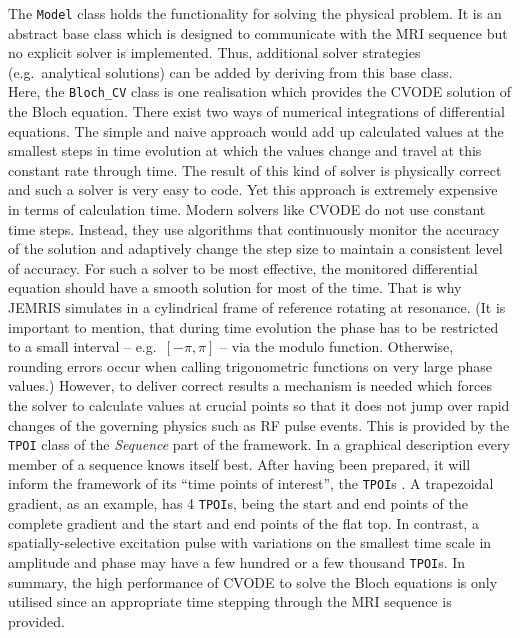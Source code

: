 \documentclass[journal,onecolumn,12pt]{IEEEtran}
\begin{document}
The \verb+Model+ class holds the functionality for solving the physical problem. It is an abstract base class which is
designed to communicate with the MRI sequence but no explicit solver is implemented. Thus, additional solver strategies
(e.g.~analytical solutions) can be added by deriving from this base class.\\ Here, the \verb+Bloch_CV+ class is one
realisation which provides the CVODE solution of the Bloch equation. There exist two ways of numerical integrations of
differential equations. The simple and naive approach would add up calculated values at the smallest steps in time
evolution at which the values change and travel at this constant rate through time. The result of this kind of solver is
physically correct and such a solver is very easy to code. Yet this approach is extremely expensive in terms of
calculation time. Modern solvers like CVODE do not use constant time steps. Instead, they use algorithms that
continuously monitor the accuracy of the solution and adaptively change the step size to maintain a consistent level of
accuracy. For such a solver to be most effective, the monitored differential equation should have a smooth solution for
most of the time. That is why JEMRIS simulates in a cylindrical frame of reference rotating at resonance. (It is
important to mention, that during time evolution the phase has to be restricted to a small interval -- e.g.~$[-\pi,\pi]$
-- via the modulo function. Otherwise, rounding errors occur when calling trigonometric functions on very large phase
values.) However, to deliver correct results a mechanism is needed which forces the solver to calculate values at
crucial points so that it does not jump over rapid changes of the governing physics such as RF pulse events. This is
provided by the \verb+TPOI+ class of the {\it Sequence} part of the framework. In a graphical description every member
of a sequence knows itself best. After having been prepared, it will inform the framework of its ``time points of
interest'', the \verb+TPOI+s . A trapezoidal gradient, as an example, has 4 \verb+TPOI+s, being the start and end points
of the complete gradient and the start and end points of the flat top. In contrast, a spatially-selective excitation
pulse with variations on the smallest time scale in amplitude and phase may have a few hundred or a few thousand
\verb+TPOI+s. In summary, the high performance of CVODE to solve the Bloch equations is only utilised since an
appropriate time stepping through the MRI sequence is provided.\\
\end{document}
